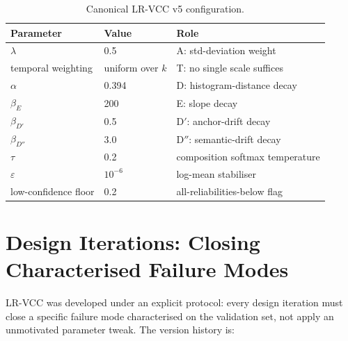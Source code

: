 \begin{table}[h]
\centering
\caption{Canonical LR-VCC v5 configuration.}
\label{tab:method:config}
\begin{tabular}{lll}
\hline
\textbf{Parameter} & \textbf{Value} & \textbf{Role} \\
\hline
$\lambda$ & 0.5 & A: std-deviation weight \\
temporal weighting & uniform over $k$ & T: no single scale suffices \\
$\alpha$ & 0.394 & D: histogram-distance decay \\
$\beta_E$ & 200 & E: slope decay \\
$\beta_{D'}$ & 0.5 & D$'$: anchor-drift decay \\
$\beta_{D''}$ & 3.0 & D$''$: semantic-drift decay \\
$\tau$ & 0.2 & composition softmax temperature \\
$\varepsilon$ & $10^{-6}$ & log-mean stabiliser \\
low-confidence floor & 0.2 & all-reliabilities-below flag \\
\hline
\end{tabular}
\end{table}

\section{Design Iterations: Closing Characterised Failure Modes}
\label{sec:method:iterations}

LR-VCC was developed under an explicit protocol: every design iteration must close a
specific failure mode characterised on the validation set, not apply an unmotivated
parameter tweak. The version history is:

